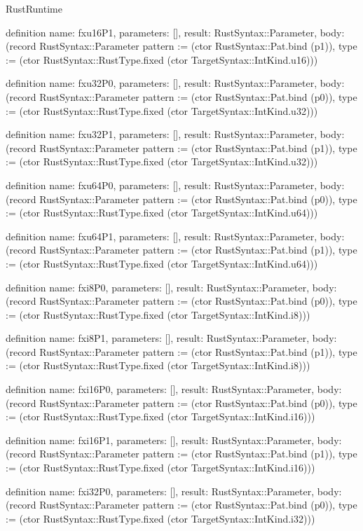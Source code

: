 \begin{lexlean}{RustRuntime}
\begin{semanticmodule}
definition{
  name: fxu16P1,
  parameters: [],
  result: RustSyntax::Parameter,
  body: (record RustSyntax::Parameter {pattern := (ctor RustSyntax::Pat.bind (p1)), type := (ctor RustSyntax::RustType.fixed (ctor TargetSyntax::IntKind.u16))})
}

definition{
  name: fxu32P0,
  parameters: [],
  result: RustSyntax::Parameter,
  body: (record RustSyntax::Parameter {pattern := (ctor RustSyntax::Pat.bind (p0)), type := (ctor RustSyntax::RustType.fixed (ctor TargetSyntax::IntKind.u32))})
}

definition{
  name: fxu32P1,
  parameters: [],
  result: RustSyntax::Parameter,
  body: (record RustSyntax::Parameter {pattern := (ctor RustSyntax::Pat.bind (p1)), type := (ctor RustSyntax::RustType.fixed (ctor TargetSyntax::IntKind.u32))})
}

definition{
  name: fxu64P0,
  parameters: [],
  result: RustSyntax::Parameter,
  body: (record RustSyntax::Parameter {pattern := (ctor RustSyntax::Pat.bind (p0)), type := (ctor RustSyntax::RustType.fixed (ctor TargetSyntax::IntKind.u64))})
}

definition{
  name: fxu64P1,
  parameters: [],
  result: RustSyntax::Parameter,
  body: (record RustSyntax::Parameter {pattern := (ctor RustSyntax::Pat.bind (p1)), type := (ctor RustSyntax::RustType.fixed (ctor TargetSyntax::IntKind.u64))})
}

definition{
  name: fxi8P0,
  parameters: [],
  result: RustSyntax::Parameter,
  body: (record RustSyntax::Parameter {pattern := (ctor RustSyntax::Pat.bind (p0)), type := (ctor RustSyntax::RustType.fixed (ctor TargetSyntax::IntKind.i8))})
}

definition{
  name: fxi8P1,
  parameters: [],
  result: RustSyntax::Parameter,
  body: (record RustSyntax::Parameter {pattern := (ctor RustSyntax::Pat.bind (p1)), type := (ctor RustSyntax::RustType.fixed (ctor TargetSyntax::IntKind.i8))})
}

definition{
  name: fxi16P0,
  parameters: [],
  result: RustSyntax::Parameter,
  body: (record RustSyntax::Parameter {pattern := (ctor RustSyntax::Pat.bind (p0)), type := (ctor RustSyntax::RustType.fixed (ctor TargetSyntax::IntKind.i16))})
}

definition{
  name: fxi16P1,
  parameters: [],
  result: RustSyntax::Parameter,
  body: (record RustSyntax::Parameter {pattern := (ctor RustSyntax::Pat.bind (p1)), type := (ctor RustSyntax::RustType.fixed (ctor TargetSyntax::IntKind.i16))})
}

definition{
  name: fxi32P0,
  parameters: [],
  result: RustSyntax::Parameter,
  body: (record RustSyntax::Parameter {pattern := (ctor RustSyntax::Pat.bind (p0)), type := (ctor RustSyntax::RustType.fixed (ctor TargetSyntax::IntKind.i32))})
}


\end{semanticmodule}
\end{lexlean}
